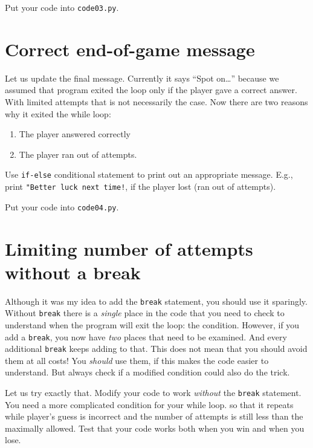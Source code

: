 \documentclass[
]{book}
\providecommand{\tightlist}{%
  \setlength{\itemsep}{0pt}\setlength{\parskip}{0pt}}
\begin{document}
Put your code into \texttt{code03.py}.

\hypertarget{correct-end-of-game-message}{%
\section{Correct end-of-game message}\label{correct-end-of-game-message}}

Let us update the final message. Currently it says ``Spot on\ldots{}'' because we assumed that program exited the loop only if the player gave a correct answer. With limited attempts that is not necessarily the case. Now there are two reasons why it exited the while loop:

\begin{enumerate}
\def\labelenumi{\arabic{enumi}.}
\tightlist
\item
  The player answered correctly
\item
  The player ran out of attempts.
\end{enumerate}

Use \texttt{if-else} conditional statement to print out an appropriate message. E.g., print \texttt{"Better\ luck\ next\ time!}, if the player lost (ran out of attempts).

Put your code into \texttt{code04.py}.

\hypertarget{limiting-number-of-attempts-without-a-break}{%
\section{Limiting number of attempts without a break}\label{limiting-number-of-attempts-without-a-break}}

Although it was my idea to add the \texttt{break} statement, you should use it sparingly. Without \texttt{break} there is a \emph{single} place in the code that you need to check to understand when the program will exit the loop: the condition. However, if you add a \texttt{break}, you now have \emph{two} places that need to be examined. And every additional \texttt{break} keeps adding to that. This does not mean that you should avoid them at all costs! You \emph{should} use them, if this makes the code easier to understand. But always check if a modified condition could also do the trick.

Let us try exactly that. Modify your code to work \emph{without} the \texttt{break} statement. You need a more complicated condition for your while loop. so that it repeats while player's guess is incorrect and the number of attempts is still less than the maximally allowed. Test that your code works both when you win and when you lose.
\end{document}
